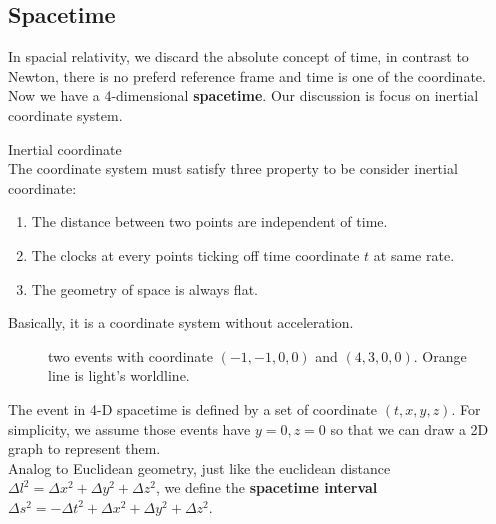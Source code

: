 \documentclass[12pt]{article}
\theoremstyle{mystyle}{\newtheorem{definition}{Definition}[section]}
\theoremstyle{mystyle}{\newtheorem{theorem}[definition]{Theorem}}
\theoremstyle{mystyle}{\newtheorem*{remark}{Remark}}
\theoremstyle{mystyle}{\newtheorem*{example}{Example}}
\theoremstyle{mystyle}{\newtheorem*{examples}{Examples}}
\theoremstyle{cstyle}{\newtheorem*{cthm}{}}
\begin{document}
\subsection{Spacetime}
In spacial relativity, we discard the absolute concept of time, in contrast to Newton, there is no preferd reference frame
and time is one of the coordinate.
Now we have a 4-dimensional \textbf{spacetime}. Our discussion is focus on inertial coordinate system.
\begin{definition}
  Inertial coordinate \\
  The coordinate system must satisfy three property to be consider inertial coordinate:
  \begin{enumerate}
    \item The distance between two points are independent of time.
    \item The clocks at every points ticking off time coordinate $t$ at same rate.
    \item The geometry of space is always flat.
  \end{enumerate}
  Basically, it is a coordinate system without acceleration.
\end{definition}

\begin{figure}[ht]
  \begin{center}
    \caption[]{two events with coordinate $(-1, -1, 0, 0)$ and $(4, 3, 0, 0)$. Orange line is light's worldline.}
  \end{center}
\end{figure}

The event in 4-D spacetime is defined by a set of coordinate \((t, x, y, z)\).
For simplicity, we assume those events have $y=0, z=0$ so that we can draw a 2D graph to represent them.\\
Analog to Euclidean geometry, just like the euclidean distance \(\Delta l^2 = \Delta x^2 + \Delta y^2 + \Delta z^2\), we define the
\textbf{spacetime interval} $\Delta s^2 = - \Delta t^2 + \Delta x^2 + \Delta y^2 + \Delta z^2$.
\end{document}
